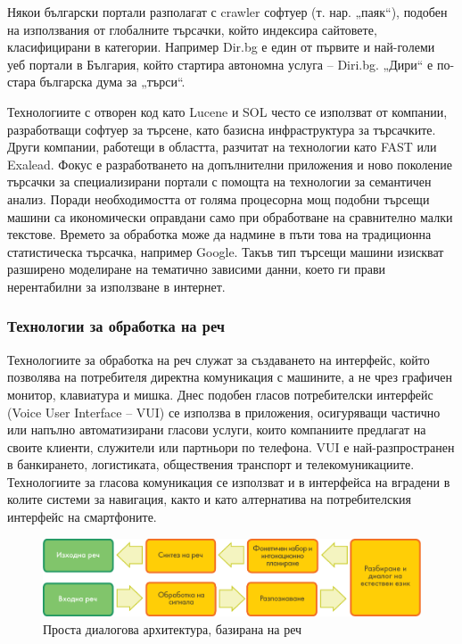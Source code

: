 \documentclass[]{../../metanetpaper}
\begin{document}
\begin{multicols}{2}
Някои български портали разполагат с crawler софтуер (т. нар.
 „паяк“), подобен на използвания от глобалните
 търсачки, който индексира сайтовете, класифицирани в
 категории. Например Dir.bg е един от първите и най-големи уеб портали в България, който стартира
 автономна услуга – Diri.bg. „Дири“ е по-стара българска дума за „търси“. 

Технологиите с отворен код като
 Lucene и SOL често се използват от компании,
 разработващи софтуер за търсене, като базисна
 инфраструктура за търсачките. Други компании,
 работещи в областта, разчитат на технологии като FAST или Exalead.
Фокус е разработването на допълнителни приложения и ново поколение търсачки за специализирани портали с помощта на технологии за семантичен анализ. Поради необходимостта от голяма процесорна мощ подобни търсещи машини са икономически оправдани само при обработване на сравнително малки текстове. Времето за обработка може да надмине в пъти това на традиционна статистическа търсачка, например Google. Такъв тип търсещи машини изискват разширено моделиране на тематично зависими данни, което ги прави нерентабилни за използване в интернет.

\subsubsection{Технологии за обработка на реч}

Технологиите за обработка на реч служат за създаването на интерфейс, който позволява на потребителя директна комуникация с машините, а не чрез графичен монитор, клавиатура и мишка. Днес подобен гласов
 потребителски интерфейс (Voice User Interface -- VUI) се използва в приложения, осигуряващи частично или напълно
 автоматизирани гласови услуги, които компаниите предлагат на своите клиенти, служители или партньори
 по телефона. VUI е най-разпространен в банкирането, логистиката,
 обществения транспорт и телекомуникациите.
 Технологиите за гласова комуникация се използват и в интерфейса на вградени в колите системи за навигация, както и като алтернатива на потребителския
 интерфейс на смартфоните.

\begin{figure}[htb]
  \center  \includegraphics[width=\textwidth]{../_media/bulgarian/simple_speech-based_dialogue_architecture}
  \center
  \caption{Проста диалогова архитектура, базирана на реч}
  \label{fig:dialoguearch_de}
\end{figure}


\end{multicols}
\end{document}
